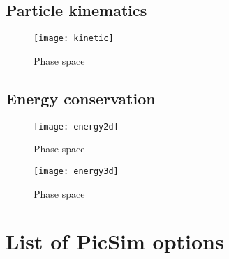 \documentclass[10pt,a4paper]{article}
\newcommand*{\picsim}{\textsf{PicSim}\xspace}
\begin{document}
\subsection{Particle kinematics}

\begin{figure}
\centerline{\texttt{[image: kinetic]}}
\caption{Phase space}
\label{fig:kinetic}
\end{figure}

\subsection{Energy conservation}

\begin{figure}
\centerline{\texttt{[image: energy2d]}}
\caption{Phase space}
\label{fig:energy2d}
\end{figure}

\begin{figure}
\centerline{\texttt{[image: energy3d]}}
\caption{Phase space}
\label{fig:energy3d}
\end{figure}



\clearpage

\appendix
\section{List of \picsim options}
\end{document}
